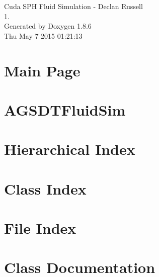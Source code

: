 \documentclass[twoside]{book}
\newcommand{\clearemptydoublepage}{%
  \newpage{\pagestyle{empty}\cleardoublepage}%
}
\begin{document}
\hypersetup{pageanchor=false}
\begin{titlepage}
\vspace*{7cm}
\begin{center}%
{\Large Cuda S\-P\-H Fluid Simulation -\/ Declan Russell \\[1ex]\large 1. }\\
\vspace*{1cm}
{\large Generated by Doxygen 1.8.6}\\
\vspace*{0.5cm}
{\small Thu May 7 2015 01:21:13}\\
\end{center}
\end{titlepage}
\clearemptydoublepage
\tableofcontents
\clearemptydoublepage
{}
\hypersetup{pageanchor=true}

\chapter{Main Page}
\label{index}\hypertarget{index}{}
\chapter{A\-G\-S\-D\-T\-Fluid\-Sim}
\label{md__r_e_a_d_m_e}
\hypertarget{md__r_e_a_d_m_e}{}

\chapter{Hierarchical Index}

\chapter{Class Index}

\chapter{File Index}

\chapter{Class Documentation}

































\end{document}
